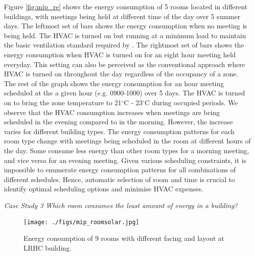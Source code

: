 Figure \ref{fig:mip_re} shows the energy consumption of 5 rooms located in different buildings, with meetings being held at different time of the day over 5 summer days. The leftmost set of bars shows the energy consumption when no meeting is being held. The HVAC is turned on but running at a minimum load to maintain the basic ventilation standard required by \cite{ashrae2013thermal}. The rightmost set of bars shows the energy consumption when HVAC is turned on for an eight hour meeting held everyday. This setting can also be perceived as the conventional approach where HVAC is turned on throughout the day regardless of the occupancy of a zone. The rest of the graph shows the energy consumption for an hour meeting scheduled at the a given hour (e.g. 0900-1000) over 5 days. The HVAC is turned on to bring the zone temperature to 21$^\circ$C - 23$^\circ$C during occupied periods. We observe that the HVAC consumption increases when meetings are being scheduled in the evening compared to in the morning. However, the increase varies for different building types. The energy consumption patterns for each room type change with meetings being scheduled in the room at different hours of the day. Some consume less energy than other room types for a morning meeting, and vice versa for an evening meeting. Given various scheduling constraints, it is impossible to enumerate energy consumption patterns for all combinations of different schedules. Hence, automatic selection of room and time is crucial to identify optimal scheduling options and minimise HVAC expenses. 

\vspace{10px}
\emph{Case Study 3} \quad \textsl{Which room consumes the least amount of energy in a building?}
\vspace{10px}

\begin{figure}
	\centering
		\texttt{[image: ./figs/mip\_roomsolar.jpg]}		
	\caption{Energy consumption of 9 rooms with different facing and layout at LRHC building.}
	\label{fig:mip_rs}
\end{figure}

